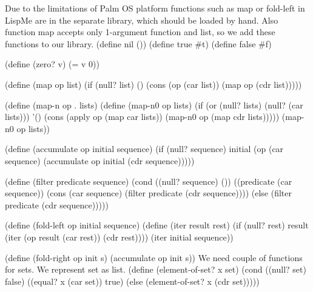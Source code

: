\documentclass[a4paper,10pt]{article}%
\theoremstyle{definition} \newtheorem{Def}{Definition}
\begin{document}
\nwenddocs{}\nwdocspar
Due to the limitations of Palm OS platform functions such as {\Tt{}map\nwendquote} or {\Tt{}fold-left\nwendquote} in LispMe are in the separate library, which should be loaded by hand. Also function {\Tt{}map\nwendquote} accepts only 1-argument function and list, so we add these functions to our library. 
\nwenddocs{}\endmoddef\nwstartdeflinemarkup{}\nwenddeflinemarkup
(define nil ())
(define true #t)
(define false #f)

(define (zero? v)
        (= v 0))

(define (map op list)
        (if (null? list) ()
                (cons (op (car list)) (map op (cdr list)))))

(define (map-n op . lists) 
    (define (map-n0 op  lists)
        (if (or (null? lists) (null? (car lists))) '()
        (cons (apply op (map car lists))
                (map-n0 op  (map cdr lists)))))
    (map-n0 op lists))

(define (accumulate op initial sequence)
  (if (null? sequence)
      initial
      (op (car sequence)
          (accumulate op initial (cdr sequence)))))

(define (filter predicate sequence)
  (cond ((null? sequence) ())
        ((predicate (car sequence))
         (cons (car sequence)
               (filter predicate (cdr sequence))))
        (else (filter predicate (cdr sequence)))))

(define (fold-left op initial sequence)
  (define (iter result rest)
    (if (null? rest)
        result
        (iter (op result (car rest))
              (cdr rest))))
  (iter initial sequence))

(define (fold-right op init s) (accumulate op init s))
\nwendcode{}\nwdocspar
We need couple of functions for sets. We represent set as list.
\nwenddocs{}\endmoddef\nwstartdeflinemarkup{}\nwenddeflinemarkup
(define (element-of-set? x set)
  (cond ((null? set) false)
        ((equal? x (car set)) true)
        (else (element-of-set? x (cdr set)))))
\end{document}

